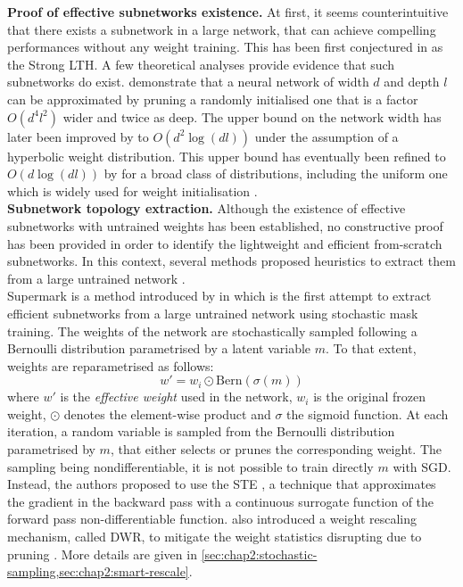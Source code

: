 \noindent\textbf{Proof of effective subnetworks existence.} At first, it seems counterintuitive that
there exists a subnetwork in a large network, that can achieve compelling
performances without any weight training. This has been first conjectured in
\cite{DBLP:conf/cvpr/RamanujanWKFR20} as the Strong \acl{LTH}. A  few
theoretical analyses provide evidence that such subnetworks do exist.
\cite{DBLP:conf/icml/MalachYSS20} demonstrate that a neural network of width $d$
and depth $l$ can be approximated by pruning a randomly initialised one that is
a factor $O(d^4l^2)$ wider and twice as deep. The  upper bound on the network
width has later been improved by \cite{DBLP:conf/nips/OrseauHR20} to
$O(d^2\log(dl))$ under the assumption of a hyperbolic weight distribution. This
upper bound has eventually been refined to $O(d\log(dl))$ by
\cite{DBLP:conf/nips/PensiaRNVP20} for a broad class of distributions, including
the uniform one which is widely used for weight initialisation
\cite{DBLP:conf/iccv/HeZRS15}.\\

\noindent\textbf{Subnetwork topology extraction.} Although the existence of
effective subnetworks with untrained weights has been established, no
constructive proof has been provided in order to identify the lightweight and
efficient from-scratch subnetworks. In this context, several methods proposed
heuristics to extract them from a large untrained network
\cite{DBLP:conf/nips/ZhouLLY19,DBLP:conf/cvpr/RamanujanWKFR20}.\\

Supermark is a method introduced by \citeauthor{DBLP:conf/nips/ZhouLLY19} in
\cite{DBLP:conf/nips/ZhouLLY19} which is the first attempt to extract efficient
subnetworks from a large untrained network using stochastic mask training. The
weights of the network are stochastically sampled following a Bernoulli
distribution parametrised by a latent variable $m$. To that extent, weights are
reparametrised as follows:
\begin{equation}
  w' = w_i \odot \text{Bern}(\sigma(m))
\end{equation}
where $w'$ is the \emph{effective weight} used in the network, $w_i$ is the
original frozen weight, $\odot$ denotes the element-wise product and $\sigma$
the sigmoid function. At each iteration, a random variable is sampled from the
Bernoulli distribution parametrised by $m$, that either selects or prunes the
corresponding weight. The sampling being nondifferentiable, it is not possible
to train directly $m$ with \ac{SGD}. Instead, the authors proposed to use the
\ac{STE} \cite{DBLP:journals/corr/BengioLC13}, a technique that approximates the
gradient in the backward pass with a continuous surrogate function of the
forward pass non-differentiable function. \citeauthor{DBLP:conf/nips/ZhouLLY19}
also introduced a weight rescaling mechanism, called \ac{DWR}, to mitigate the
weight statistics disrupting due to pruning \cite{DBLP:conf/iccv/HeZRS15}. More
details are given in
\cref{sec:chap2:stochastic-sampling,sec:chap2:smart-rescale}.\\


